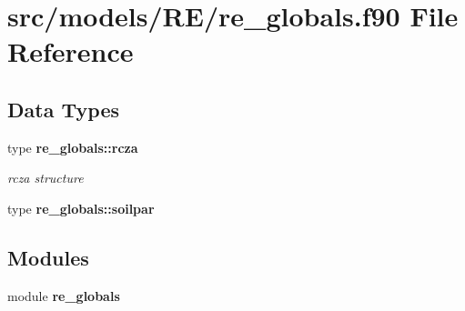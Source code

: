 \section{src/models/\+R\+E/re\+\_\+globals.f90 File Reference}
\label{re__globals_8f90}
\subsection*{Data Types}
\begin{DoxyCompactItemize}
\item 
type {\bf re\+\_\+globals\+::rcza}
\begin{DoxyCompactList}\small\item\em rcza structure \end{DoxyCompactList}\item 
type {\bf re\+\_\+globals\+::soilpar}
\end{DoxyCompactItemize}
\subsection*{Modules}
\begin{DoxyCompactItemize}
\item 
module {\bf re\+\_\+globals}
\end{DoxyCompactItemize}
